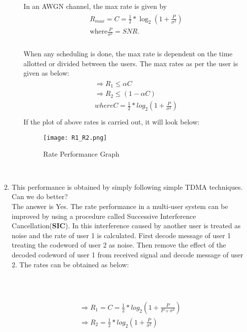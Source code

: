\documentclass[a4paper]{article}
\begin{document}
\begin{enumerate}
\begin{enumerate}
In an AWGN channel, the max rate  is  given by
\begin{align}
\begin{split}
R_{max} = C = \frac{1}{2}*\log_2(1+\frac{P}{\sigma^2})\\
\text{where} \frac{P}{\sigma^2} = SNR.
\end{split}
\end{align}
\\
When any scheduling is done, the max rate is dependent on the time allotted or divided between the users. The max rates as per the user is given as below:
\begin{align}
\begin{split}
	\Rightarrow R_1 \leq \alpha C\\
	\Rightarrow R_2 \leq (1-\alpha C)\\
	where C = \frac{1}{2}*log_2(1+\frac{P}{\sigma^2})\\
\end{split}
\end{align}
If the plot of above rates is carried out, it will look below:
\begin{figure}[!ht]
\centering
\texttt{[image: R1\_R2.png]}
\caption{Rate Performance Graph}\label{fig:4}
\end{figure} \\
\end{enumerate}
\item This performance is obtained by simply following simple TDMA techniques. Can we do better?
\\
The answer is Yes. The rate performance in a multi-user system can be improved by using a procedure called Successive Interference Cancellation(\textbf{SIC}). In this interference caused by another user is treated as noise and the rate of user 1 is calculated. First decode message of user 1 treating the codeword of user 2 as noise. Then remove the effect of the decoded codeword of user 1 from received signal and decode message of user 2. The rates can be obtained as below:\\
\\
\\
\\

\begin{align}
\begin{split}
	\Rightarrow R_1 = C = \frac{1}{2}*log_2(1+\frac{P}{P+\sigma^2})\\
	\Rightarrow R_2 = \frac{1}{2}*log_2(1+\frac{P}{\sigma^2})\\
\end{split}
\end{align}
\\
\\
\\


\end{enumerate}
\end{document}
